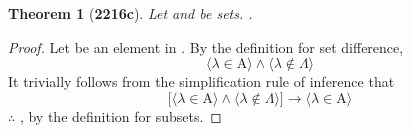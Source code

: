 \documentclass[preview]{standalone}
\newtheorem{theorem}{Theorem}
\begin{document}
\begin{theorem}[\textbf{2216c}]
    Let  and \bm{$\Lambda$} be sets. 
    .
\end{theorem}
\begin{proof}
    Let \bm{$\lambda$} be an element in . 
    By the definition for set difference,
    \begin{equation*}
        \Big \langle \lambda \in \mathrm{A} \Big \rangle
            \land
        \Big \langle \lambda \notin \Lambda \Big \rangle   
    \end{equation*}
    It trivially follows from the simplification rule of inference that
    \begin{equation*}
        \bigg[
            \Big \langle \lambda \in \mathrm{A} \Big \rangle
                \land
            \Big \langle \lambda \notin \Lambda \Big \rangle
        \bigg]
            \rightarrow
        \Big \langle \lambda \in \mathrm{A} \Big \rangle
    \end{equation*}
    $\therefore$ 
    ,
    by the definition for subsets.
\end{proof}
\end{document}
